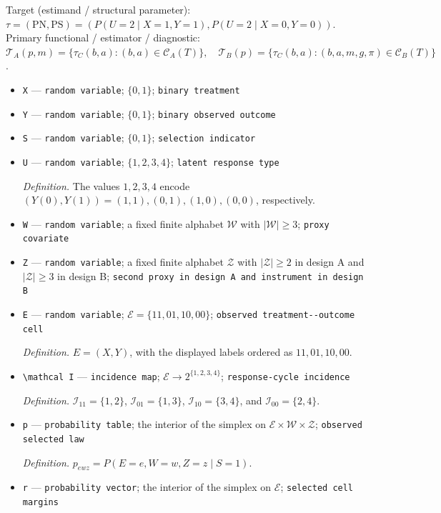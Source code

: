 \documentclass{article}
\begin{document}
Target (estimand / structural parameter): \(\tau=(\mathrm{PN},\mathrm{PS})=(P(U=2\mid X=1,Y=1),P(U=2\mid X=0,Y=0))\).
Primary functional / estimator / diagnostic: \(\mathcal T_A(p,m)=\{\tau_C(b,a):(b,a)\in\mathcal C_A(T)\},\quad \mathcal T_B(p)=\{\tau_C(b,a):(b,a,m,g,\pi)\in\mathcal C_B(T)\}\).
\begin{itemize}
  \item \texttt{X} --- \texttt{random variable}; \(\{0,1\}\); \texttt{binary treatment}
  \item \texttt{Y} --- \texttt{random variable}; \(\{0,1\}\); \texttt{binary observed outcome}
  \item \texttt{S} --- \texttt{random variable}; \(\{0,1\}\); \texttt{selection indicator}
  \item \texttt{U} --- \texttt{random variable}; \(\{1,2,3,4\}\); \texttt{latent response type}
  \par\smallskip\noindent\emph{Definition.} The values \(1,2,3,4\) encode \((Y(0),Y(1))=(1,1),(0,1),(1,0),(0,0)\), respectively.
  \item \texttt{W} --- \texttt{random variable}; a fixed finite alphabet \(\mathcal W\) with \(|\mathcal W|\ge 3\); \texttt{proxy covariate}
  \item \texttt{Z} --- \texttt{random variable}; a fixed finite alphabet \(\mathcal Z\) with \(|\mathcal Z|\ge 2\) in design A and \(|\mathcal Z|\ge 3\) in design B; \texttt{second proxy in design A and instrument in design B}
  \item \texttt{E} --- \texttt{random variable}; \(\mathcal E=\{11,01,10,00\}\); \texttt{observed treatment-\allowbreak{}-\allowbreak{}outcome cell}
  \par\smallskip\noindent\emph{Definition.} \(E=(X,Y)\), with the displayed labels ordered as \(11,01,10,00\).
  \item \texttt{\textbackslash{}\allowbreak{}mathcal I} --- \texttt{incidence map}; \(\mathcal E\to 2^{\{1,2,3,4\}}\); \texttt{response-\allowbreak{}cycle incidence}
  \par\smallskip\noindent\emph{Definition.} \(\mathcal I_{11}=\{1,2\}\), \(\mathcal I_{01}=\{1,3\}\), \(\mathcal I_{10}=\{3,4\}\), and \(\mathcal I_{00}=\{2,4\}\).
  \item \texttt{p} --- \texttt{probability table}; the interior of the simplex on \(\mathcal E\times\mathcal W\times\mathcal Z\); \texttt{observed selected law}
  \par\smallskip\noindent\emph{Definition.} \(p_{ewz}=P(E=e,W=w,Z=z\mid S=1)\).
  \item \texttt{r} --- \texttt{probability vector}; the interior of the simplex on \(\mathcal E\); \texttt{selected cell margins}

\end{itemize}
\end{document}
